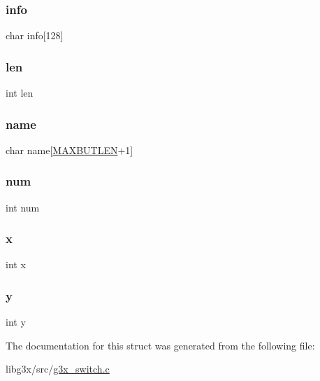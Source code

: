 \subsubsection{\texorpdfstring{info}{info}}
{\footnotesize\ttfamily char info\mbox{[}128\mbox{]}}

\mbox{\label{struct_g3_xswitch_afed088663f8704004425cdae2120b9b3}} 
\subsubsection{\texorpdfstring{len}{len}}
{\footnotesize\ttfamily int len}

\mbox{\label{struct_g3_xswitch_aa998d085055b9e9634ea1781cc0163c7}} 
\subsubsection{\texorpdfstring{name}{name}}
{\footnotesize\ttfamily char name\mbox{[}\hyperlink{g3x__switch_8c_a0e40ba0c0da54aafd8c34999455ec4fa}{M\+A\+X\+B\+U\+T\+L\+EN}+1\mbox{]}}

\mbox{\label{struct_g3_xswitch_a86cf672daa4e0ad11ad10efc894d19c8}} 
\subsubsection{\texorpdfstring{num}{num}}
{\footnotesize\ttfamily int num}

\mbox{\label{struct_g3_xswitch_a6150e0515f7202e2fb518f7206ed97dc}} 
\subsubsection{\texorpdfstring{x}{x}}
{\footnotesize\ttfamily int x}

\mbox{\label{struct_g3_xswitch_a0a2f84ed7838f07779ae24c5a9086d33}} 
\subsubsection{\texorpdfstring{y}{y}}
{\footnotesize\ttfamily int y}



The documentation for this struct was generated from the following file\+:\begin{DoxyCompactItemize}
\item 
libg3x/src/\hyperlink{g3x__switch_8c}{g3x\+\_\+switch.\+c}\end{DoxyCompactItemize}
